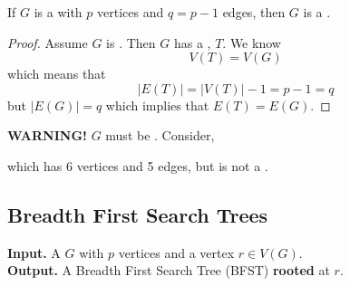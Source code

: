 \documentclass[english, 11pt]{article}
\begin{document}
\begin{cor}
  If $G$ is a   with $p$ vertices and $q = p - 1$ edges, then $G$ is a .
\end{cor}

\begin{proof}
  Assume $G$ is . Then $G$ has a , $T$. We know
  \[ V(T) = V(G) \]
  which means that \[
  |E(T)| = |V(T)| - 1 = p-1 = q\]
  but $|E(G)| = q$ which implies that $E(T) = E(G)$.
\end{proof}
\begin{note}
  \textbf{WARNING!} $G$ must be . Consider,
  \begin{center}
\end{center}
which has 6 vertices and 5 edges, but is not a .
\end{note}

\subsection{Breadth First Search Trees}

\textbf{Input.} A  $G$ with $p$ vertices and a vertex $r \in V(G)$. \\

\textbf{Output.} A Breadth First Search Tree (BFST) \textbf{rooted} at $r$.
\end{document}
